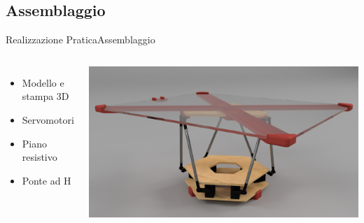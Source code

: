 \documentclass[10pt,aspectratio=169
	]{beamer}
\begin{document}
	\subsection{Assemblaggio}
	\begin{frame}{Realizzazione Pratica}{Assemblaggio}

	\begin{columns}
	
	\begin{itemize}
		\item Modello e stampa 3D
		\item Servomotori
		\item Piano resistivo
		\item Ponte ad H
	\end{itemize}
	\centering \includegraphics[width=\textwidth]{./images/stewart.png}
	\end{columns}
	\end{frame}
	
\end{document}
